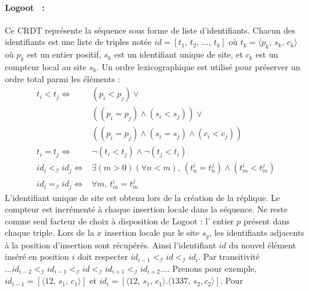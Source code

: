 
\paragraph{Logoot~\cite{weiss2010collaborative, weiss2009logoot,
    weiss2010logootundo} :} Ce CRDT représente la séquence sous forme de liste
d'identifiants. Chacun des identifiants est une liste de triples notée
$id = [t_1,\,t_2,\,\ldots,\,t_k]$ où $t_k=\langle p_k,\,s_k,\,c_k \rangle$ où
$p_k$ est un entier positif, $s_k$ est un identifiant unique de site, et $c_k$
est un compteur local au site $s_k$. Un ordre lexicographique est utilisé pour
préserver un ordre total parmi les éléments :
\begin{align*}
  t_i < t_j \iff & (p_i < p_j) \vee \\
                 & ((p_i = p_j) \wedge (s_i<s_j)) \vee \\
                 & ((p_i = p_j) \wedge (s_i = s_j) \wedge (c_i < c_j)) \\
  t_i = t_j \iff & \neg (t_i < t_j) \wedge \neg (t_j < t_i) \\
  id_i <_\mathcal{I} id_j \iff & \exists (m > 0)(\forall n < m),\, (t^i_n = t^j_n) \wedge (t^i_m < t^j_m) \\
  id_i =_\mathcal{I} id_j \iff & \forall m,\, t^i_m = t^j_m
\end{align*}
L'identifiant unique de site est obtenu lors de la création de la réplique. Le
compteur est incrémenté à chaque insertion locale dans la séquence. Ne reste
comme seul facteur de choix à disposition de Logoot : l' entier $p$ présent dans
chaque triple. Lors de la $x$ insertion locale par le site $s_y$, les
identifiants adjacents à la position d'insertion sont récupérés. Ainsi
l'identifiant $id$ du nouvel élément inséré en position $i$ doit respecter
$id_{i-1}<_\mathcal{I} id <_\mathcal{I} id_i$. Par transitivité
$\ldots id_{i-2} <_\mathcal{I} id_{i-1} <_\mathcal{I} id <_\mathcal{I} id_{i+1}
<_\mathcal{I} id_{i+2} \ldots$.
Prenons pour exemple, $id_{i-1}=[\langle 12,\,s_1,\,c_1\rangle]$ et
$id_{i}=[\langle 12,\, s_1,\,c_1\rangle.\langle 1337,\, s_2, c_2\rangle]$. Pour
